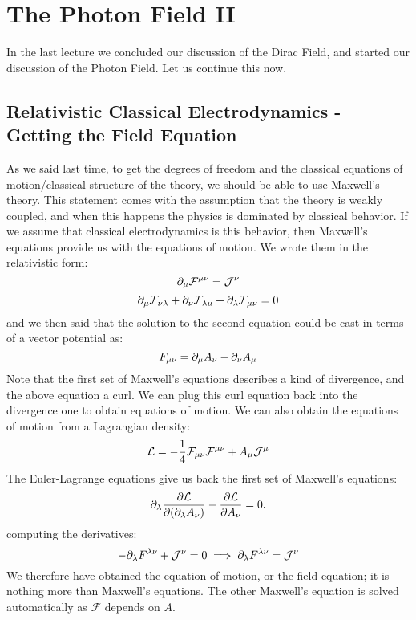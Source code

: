 \section{The Photon Field II}
In the last lecture we concluded our discussion of the Dirac Field, and started our discussion of the Photon Field. Let us continue this now.

\subsection{Relativistic Classical Electrodynamics - Getting the Field Equation}
As we said last time, to get the degrees of freedom and the classical equations of motion/classical structure of the theory, we should be able to use Maxwell's theory. This statement comes with the assumption that the theory is weakly coupled, and when this happens the physics is dominated by classical behavior. If we assume that classical electrodynamics is this behavior, then Maxwell's equations provide us with the equations of motion. We wrote them in the relativistic form:
\begin{equation}
    \partial_\mu \mathcal{F}^{\mu\nu} = \mathcal{J}^\nu
\end{equation}
\begin{equation}
    \partial_\mu \mathcal{F}_{\nu\lambda} + \partial_\nu \mathcal{F}_{\lambda\mu} + \partial_\lambda \mathcal{F}_{\mu\nu} = 0
\end{equation}
and we then said that the solution to the second equation could be cast in terms of a vector potential as:
\begin{equation}
    F_{\mu\nu} = \partial_\mu A_\nu - \partial_\nu A_\mu
\end{equation}
Note that the first set of Maxwell's equations describes a kind of divergence, and the above equation a curl. We can plug this curl equation back into the divergence one to obtain equations of motion. We can also obtain the equations of motion from a Lagrangian density:
\begin{equation}
    \mathcal{L} = -\frac{1}{4}\mathcal{F}_{\mu\nu}\mathcal{F}^{\mu\nu} + A_\mu \mathcal{J}^{\mu}
\end{equation}
The Euler-Lagrange equations give us back the first set of Maxwell's equations:
\begin{equation}
    \partial_\lambda \frac{\partial \mathcal{L}}{\partial (\partial_\lambda A_\nu)} - \frac{\partial \mathcal{L}}{\partial A_\nu} = 0.
\end{equation}
computing the derivatives:
\begin{equation}
    -\partial_\lambda F^{\lambda \nu} + \mathcal{J}^\nu = 0 \implies \partial_\lambda F^{\lambda \nu} = \mathcal{J}^\nu
\end{equation}
We therefore have obtained the equation of motion, or the field equation; it is nothing more than Maxwell's equations. The other Maxwell's equation is solved automatically as $\mathcal{F}$ depends on $A$. 

